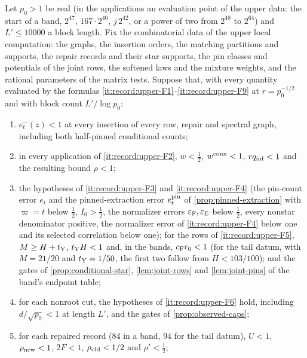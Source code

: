 \begin{lemma}\label{lem:record:domain}
Let $p_0>1$ be real (in the applications an evaluation point of the upper
data: the start of a band, $2^{47}$, $167\cdot2^{40}$, $j\,2^{42}$, or a power of
two from $2^{48}$ to $2^{64}$) and $L'\le10000$ a block length. Fix the combinatorial data of the upper
local computation: the graphs, the insertion orders, the matching partitions and
supports, the repair records and their star supports, the pin classes and
potentials of the joint rows, the softened laws and the mixture weights, and the
rational parameters of the matrix tests. Suppose that, with every quantity
evaluated by the formulas \ref{it:record:upper-F1}--\ref{it:record:upper-F9} at
$r=p_0^{-1/2}$ and with block count $L'/\log p_0$:
\begin{enumerate}[label=\textup{(G\arabic*)}]
\item\label{it:record:upper-G1} $e^-_t(z)<1$ at every insertion of every row,
 repair and spectral graph, including both half-pinned conditional counts;
\item\label{it:record:upper-G2} in every application of
 \ref{it:record:upper-F2}, $w<\frac12$, $w^{\rm conn}<1$, $rq_{\rm inf}<1$ and
 the resulting bound $\rho<1$;
\item\label{it:record:upper-G3} the hypotheses of \ref{it:record:upper-F3} and
 \ref{it:record:upper-F4} (the pin-count error $e_t$ and the pinned-extraction
 error $e^{\rm pin}_t$ of \cref{prop:pinned-extraction} with $\varpi=t$ below
 $\frac12$, $I_0>\frac12$, the normalizer errors $\eps_{\rm F},\eps_{\rm E}$ below
 $\frac12$, every nonstar denominator positive, the normalizer error of
 \ref{it:record:upper-F4} below one and its selected correlation below one); for the
 rows of \ref{it:record:upper-F5}, $M\ge H+t_{\rm Y}$, $t_{\rm Y}H<1$ and, in the
 bands, $c_{\rm F}r_0<1$ (for the tail datum, with $M=21/20$ and
 $t_{\rm Y}=1/50$, the first two follow from $H<103/100$); and the gates of
 \cref{prop:conditional-star}, \cref{lem:joint-rows} and \cref{lem:joint-pins} of the
 band's endpoint table;
\item\label{it:record:upper-G4} for each nonroot cut, the hypotheses of
 \ref{it:record:upper-F6} hold, including $d/\sqrt{p_0}<1$ at length $L'$, and the
 gates of \cref{prop:observed-caps};
\item\label{it:record:upper-G5} for each repaired record ($84$ in a band, $94$ for
 the tail datum), $U<1$, $\rho_{\rm new}<1$, $2F<1$, $\rho_{\rm old}<\frac12$ and
 $\rho'<\frac12$;

\end{enumerate}
\end{lemma}
